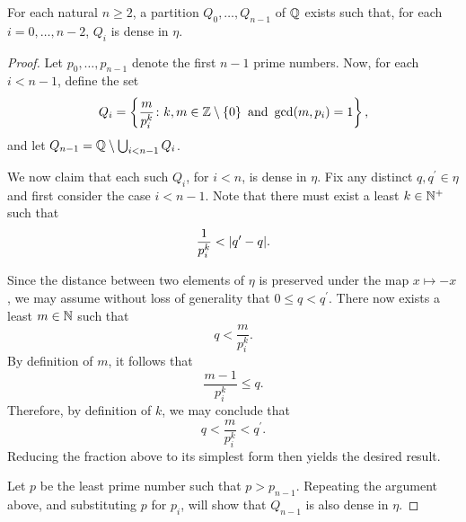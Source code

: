 \begin{prp}\label{prp:qdense}
	For each natural $n\geq 2$, a partition $Q_0,\dotsc,Q_{n-1}$ of $\mathbb{Q}$
	exists such that, for each $i=0,\dotsc,n-2$, $Q_i$ is dense in $\eta$.
\end{prp}
\begin{proof}
	Let $p_{0},\dotsc,p_{n-1}$ denote the first $n-1$ prime numbers.  Now, for each
	$i<n-1$, define the set
	\begin{equation}
		Q_{i}=\left\lbrace \frac{m}{p_{i}^{k}}\colon k,m\in\mathbb{Z}\setminus\left\lbrace 0\right\rbrace\text{
				and  }\gcd(m,p_{i})=1 \right\rbrace,
	\end{equation}
	and let $Q_{n-1}=\mathbb{Q}\setminus\bigcup_{i<n-1}Q_{i}$.

	We now claim that each such $Q_{i}$, for $i<n$, is dense in $\eta$.  Fix any
	distinct $q,q^{\prime}\in\eta$ and first consider the case $i<n-1$.  Note
	that there must exist a least $k\in\mathbb{N}^{+}$ such that
	\begin{equation}
		\frac{1}{p_{i}^{k}}<\lvert q^{\prime} - q\rvert.
	\end{equation}

	Since the distance between two elements of $\eta$ is preserved under the map
	$x\mapsto -x$, we may assume without loss of generality that
	$0\leq q<q^{\prime}$.  There now exists a least $m\in\mathbb{N}$ such that
	\begin{equation}
		q<\frac{m}{p_{i}^{k}}.
	\end{equation}
	By definition of $m$, it follows that
	\begin{equation}
		\frac{m-1}{p_{i}^{k}}\leq q.
	\end{equation}
	Therefore, by definition of $k$, we may conclude that
	\begin{equation}
		q<\frac{m}{p_{i}^{k}}<q^{\prime}.
	\end{equation}
	Reducing the fraction above to its simplest form then yields the desired
	result.

	Let $p$ be the least prime number such that $p>p_{n-1}$.  Repeating the
	argument above, and substituting $p$ for $p_{i}$, will show that $Q_{n-1}$
	is also dense in $\eta$.
\end{proof}

